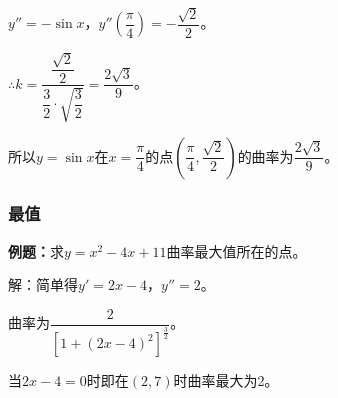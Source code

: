 $y''=-\sin x$，$y''(\dfrac{\pi}{4})=-\dfrac{\sqrt{2}}{2}$。

$\therefore k=\dfrac{\dfrac{\sqrt{2}}{2}}{\dfrac{3}{2}\cdot\sqrt{\dfrac{3}{2}}}=\dfrac{2\sqrt{3}}{9}$。

所以$y=\sin x$在$x=\dfrac{\pi}{4}$的点$(\dfrac{\pi}{4},\dfrac{\sqrt{2}}{2})$的曲率为$\dfrac{2\sqrt{3}}{9}$。

\subsubsection{最值}

\textbf{例题：}求$y=x^2-4x+11$曲率最大值所在的点。

解：简单得$y'=2x-4$，$y''=2$。

曲率为$\dfrac{2}{[1+(2x-4)^2]^{\frac{3}{2}}}$。

当$2x-4=0$时即在$(2,7)$时曲率最大为2。

